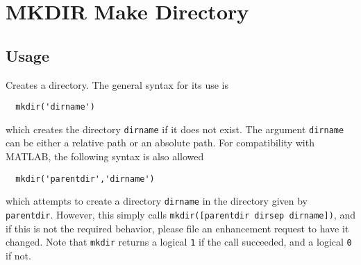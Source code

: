 \section{MKDIR Make Directory}

\subsection{Usage}

Creates a directory.  The general syntax for its use is
\begin{verbatim}
  mkdir('dirname')
\end{verbatim}
which creates the directory \verb|dirname| if it does not exist.  The argument
\verb|dirname| can be either a relative path or an absolute path.  For compatibility
with MATLAB, the following syntax is also allowed
\begin{verbatim}
  mkdir('parentdir','dirname')
\end{verbatim}
which attempts to create a directory \verb|dirname| in the directory given by \verb|parentdir|.
However, this simply calls \verb|mkdir([parentdir dirsep dirname])|, and if this is not
the required behavior, please file an enhancement request to have it changed.  Note that
\verb|mkdir| returns a logical \verb|1| if the call succeeded, and a logical \verb|0| if not.
